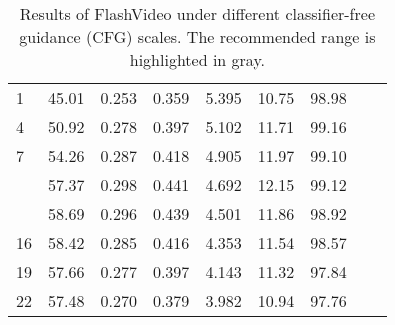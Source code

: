 \begin{table*}[h]
\begin{minipage}{0.45\textwidth}
{\begin{tabular}{lcccccccc}
1 & 45.01 & 0.253 & 0.359 & 5.395 & 10.75& 98.98 \\
4 & 50.92 & 0.278 & 0.397 & 5.102 &  11.71 & 99.16  \\
7 & 54.26 & 0.287 & 0.418 & 4.905 & 11.97 & 99.10   \\
 \rowcolor{gray!40}{10} & 57.37 & 0.298 & 0.441 & 4.692 & 12.15 & 99.12  \\ 
\rowcolor{gray!40}{13} &  58.69 & 0.296 & 0.439 & 4.501 & 11.86 & 98.92  \\
16 & 58.42 & 0.285 & 0.416 & 4.353 & 11.54 & 98.57  \\
19 & 57.66 & 0.277 & 0.397 & 4.143 & 11.32 & 97.84 \\
22 & 57.48 & 0.270 & 0.379 & 3.982 & 10.94  & 97.76  \\

\bottomrule
\end{tabular}
}
\caption{Results of FlashVideo under different classifier-free guidance (CFG) scales. The recommended range is highlighted in gray.  }\label{table:cfg}
\end{minipage}

\end{table*}
